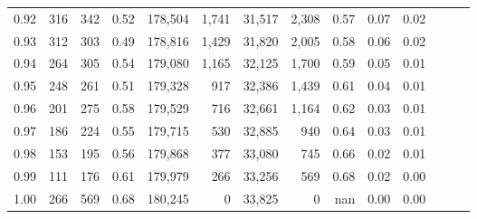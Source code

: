 \begin{tabular}{rrrrrrrrrrrrrr}
0.92 &    316 &  342 &  0.52 &  178,504 &    1,741 &  31,517 &   2,308 &  0.57 &  0.07 &      0.02 \\
0.93 &    312 &  303 &  0.49 &  178,816 &    1,429 &  31,820 &   2,005 &  0.58 &  0.06 &      0.02 \\
0.94 &    264 &  305 &  0.54 &  179,080 &    1,165 &  32,125 &   1,700 &  0.59 &  0.05 &      0.01 \\
0.95 &    248 &  261 &  0.51 &  179,328 &      917 &  32,386 &   1,439 &  0.61 &  0.04 &      0.01 \\
0.96 &    201 &  275 &  0.58 &  179,529 &      716 &  32,661 &   1,164 &  0.62 &  0.03 &      0.01 \\
0.97 &    186 &  224 &  0.55 &  179,715 &      530 &  32,885 &     940 &  0.64 &  0.03 &      0.01 \\
0.98 &    153 &  195 &  0.56 &  179,868 &      377 &  33,080 &     745 &  0.66 &  0.02 &      0.01 \\
0.99 &    111 &  176 &  0.61 &  179,979 &      266 &  33,256 &     569 &  0.68 &  0.02 &      0.00 \\
1.00 &    266 &  569 &  0.68 &  180,245 &        0 &  33,825 &       0 &   nan &  0.00 &      0.00 \\
\bottomrule
\end{tabular}

